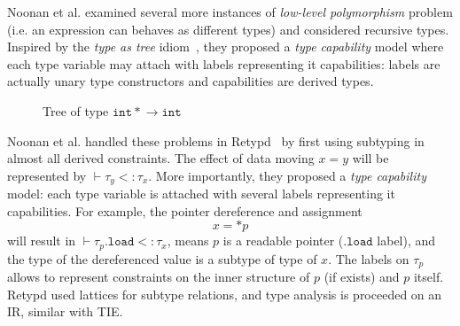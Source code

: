 \documentclass[compsoc,conference,a4paper,10pt,times]{IEEEtran}
\begin{document}
Noonan et al. examined several more instances of \emph{low-level polymorphism} problem (i.e. an expression can
behaves as different types) and considered recursive types. Inspired by the \emph{type as tree}
idiom~\cite{kozen_efficient_1993}, they proposed a
\emph{type capability} model where each type variable may attach with labels representing it
capabilities: labels are actually unary type constructors and capabilities are derived types.
\begin{figure}[h]
  \centering
  \caption{Tree of type $\mathtt{int*} \rightarrow \mathtt{int}$}
  \label{fig:treetype}
\end{figure}



Noonan et al. handled these problems in Retypd~\cite{noonan_polymorphic_2016} by first
using subtyping in almost all derived constraints. The effect of data moving $x = y$ will be represented by
$\vdash \tau_{y} <\colon \tau_{x}$. More importantly, they proposed a
\emph{type capability} model: each type variable is attached with several labels representing it capabilities.
For example, the pointer dereference and assignment
\begin{equation*}
  x = *p
\end{equation*}
will result in $\vdash \tau_{p}.\mathtt{load} <\colon \tau_{x}$, means $p$ is a readable pointer
($\mathtt{.load}$ label), and
the type of the dereferenced value is a subtype of type of $x$. The labels on $\tau_{p}$ allows to
represent constraints on the inner structure of $p$ (if exists) and $p$ itself.
Retypd used lattices for subtype relations, and type analysis is proceeded on an IR, similar with TIE.
\end{document}
